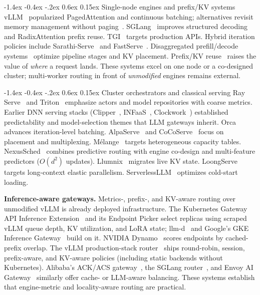 \documentclass[pdflatex,sn-mathphys-num]{sn-jnl}
\makeatletter
\renewcommand{\subsection}{\@startsection{subsection}{2}{\z@}%
  {-1.4ex \@plus -0.4ex \@minus -.2ex}%
  {0.6ex \@plus 0.15ex}%
  {\normalfont\normalsize\bfseries}}%
\makeatother
\begin{document}
\subsection{Single-node engines and prefix/KV systems}
vLLM~\cite{vllm} popularized PagedAttention and continuous batching; alternatives
revisit memory management without paging~\cite{vattention}.
SGLang~\cite{sglang,radixattention} improves structured decoding and RadixAttention
prefix reuse. TGI~\cite{tgi} targets production APIs. Hybrid iteration policies
include Sarathi-Serve~\cite{bullet} and FastServe~\cite{fastserve}. Disaggregated
prefill/decode systems~\cite{distserve,splitwise,mooncake,memserve} optimize pipeline
stages and KV placement. Prefix/KV reuse~\cite{promptcache,hydragen,cacheblend,lmcache,preble}
raises the value of \emph{where} a request lands. These systems excel on one node or a
co-designed cluster; multi-worker routing in front of \emph{unmodified} engines remains
external.

\subsection{Cluster orchestrators and classical serving}
Ray Serve~\cite{rayserve} and Triton~\cite{triton} emphasize actors and model
repositories with coarse metrics. Earlier DNN serving stacks
(Clipper~\cite{clipper}, INFaaS~\cite{infaas}, Clockwork~\cite{clockwork})
established predictability and model-selection themes that LLM gateways inherit.
Orca~\cite{orca} advances iteration-level batching. AlpaServe~\cite{alpaserve} and
CoCoServe~\cite{CocoServe} focus on placement and multiplexing. M\'{e}lange~\cite{melange}
targets heterogeneous capacity tables. NexusSched~\cite{nexussched} combines
predictive routing with engine co-design and multi-feature predictors ($O(d^2)$
updates). Llumnix~\cite{llumnix} migrates live KV state. LoongServe~\cite{loongserve}
targets long-context elastic parallelism. ServerlessLLM~\cite{serverlessllm}
optimizes cold-start loading.

\textbf{Inference-aware gateways.}
Metrics-, prefix-, and KV-aware routing over unmodified vLLM is already deployed
infrastructure. The Kubernetes Gateway API Inference
Extension~\cite{gaie} and its Endpoint Picker select replicas using scraped vLLM
queue depth, KV utilization, and LoRA state; \mbox{llm-d}~\cite{llmd} and Google's
GKE Inference Gateway~\cite{gkeinference} build on it. NVIDIA
Dynamo~\cite{dynamo} scores endpoints by cached-prefix overlap. The vLLM
production-stack router~\cite{productionstack} ships round-robin, session,
prefix-aware, and KV-aware policies (including static backends without Kubernetes).
Alibaba's ACK/ACS gateway~\cite{alibabagw}, the SGLang router~\cite{sglangrouter},
and Envoy AI Gateway~\cite{envoyai} similarly offer cache- or LLM-aware balancing.
These systems establish that engine-metric and locality-aware routing are practical.
\end{document}
